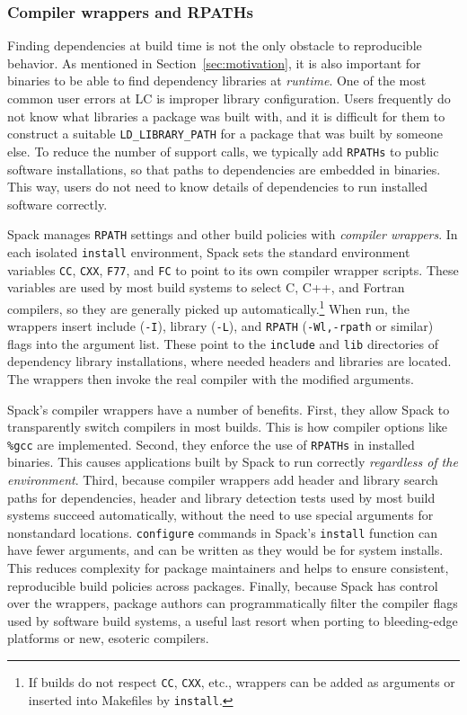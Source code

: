 \subsubsection{Compiler wrappers and RPATHs}
Finding dependencies at build time is not the only obstacle to reproducible
behavior.  As mentioned in Section~\ref{sec:motivation}, it is also important
for binaries to be able to find dependency libraries at {\it runtime}.
One of the most common user errors at LC is improper library configuration.
Users frequently do not know what libraries a package was built with, and
it is difficult for them to construct a suitable {\tt LD\_LIBRARY\_PATH} for
a package that was built by someone else.  To reduce the number of support calls,
we typically add {\tt RPATHs} to public software installations, so that paths
to dependencies are embedded in binaries. This way, users do not need to know
details of dependencies to run installed software correctly.

Spack manages {\tt RPATH} settings and other build policies with
{\it compiler wrappers}.
In each isolated {\tt install} environment, Spack sets the standard
environment variables
{\tt CC}, {\tt CXX}, {\tt F77}, and {\tt FC} to point to its own compiler
wrapper scripts.  These variables are used by most build systems to select 
C, C++, and Fortran compilers, so they are generally picked up
automatically.\footnote{If builds do not respect {\tt CC}, {\tt CXX}, etc.,
wrappers can be added as arguments or inserted into Makefiles
by {\tt install}.}
When run, the wrappers insert include ({\tt -I}), library ({\tt -L}), and
{\tt RPATH} ({\tt -Wl,-rpath} or similar) flags into the argument list.
These point to the {\tt include} and {\tt lib} directories of dependency
library installations, where needed headers and libraries are located.
The wrappers then invoke the real compiler with the modified arguments.

Spack's compiler wrappers have a number of benefits.  First, they allow
Spack to transparently switch compilers in most builds.  This is how
compiler options like {\tt \%gcc} are implemented.  Second, they enforce the
use of {\tt RPATHs} in
installed binaries.  This causes applications built by Spack to run correctly
{\it regardless of the environment}.  Third, because compiler wrappers add
header and library search paths for dependencies, header and library detection
tests used by most build systems succeed automatically, without
the need to use special arguments for nonstandard locations.  {\tt configure}
commands in Spack's {\tt install} function can have fewer arguments, and can
be written as they would be for system installs.  This reduces complexity
for package maintainers and helps to ensure consistent, reproducible
build policies across packages.  Finally, because Spack has control over the
wrappers, package authors can programmatically filter the compiler flags
used by software build systems, a useful last resort when porting to
bleeding-edge platforms or new, esoteric compilers.

